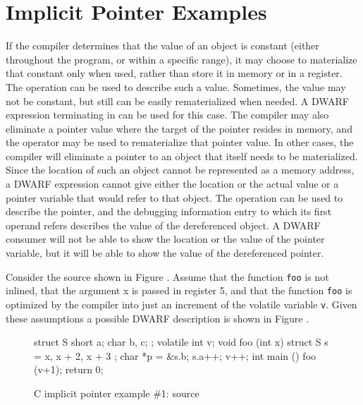 \section{Implicit Pointer Examples}
\label{app:implicitpointerexamples}
If the compiler determines that the value of an object is
constant (either throughout the program, or within a specific
range), it may choose to materialize that constant only when
used, rather than store it in memory or in a register. The
\DWOPimplicitvalue{} operation can be used to describe such a
value. Sometimes, the value may not be constant, but still can be
easily rematerialized when needed. A DWARF expression terminating
in \DWOPstackvalue{} can be used for this case. The compiler may
also eliminate a pointer value where the target of the pointer
resides in memory, and the \DWOPstackvalue{} operator may be used
to rematerialize that pointer value. In other cases, the compiler
will eliminate a pointer to an object that itself needs to be
materialized. Since the location of such an object cannot be
represented as a memory address, a DWARF expression cannot give
either the location or the actual value or a pointer variable
that would refer to that object. The \DWOPimplicitpointer{}
operation can be used to describe the pointer, and the debugging
information entry to which its first operand refers describes the
value of the dereferenced object. A DWARF consumer will not be
able to show the location or the value of the pointer variable,
but it will be able to show the value of the dereferenced
pointer.

Consider the  source shown in 
Figure .
Assume that the function \texttt{foo} is not inlined,
that the argument x is passed in register 5, and that the
function \texttt{foo} is optimized by the compiler into just 
an increment of the volatile variable \texttt{v}. Given these
assumptions a possible DWARF description is shown in
Figure .

\begin{figure}[ht]
\begin{nlnlisting}
struct S { short a; char b, c; };
volatile int v;
void foo (int x)
{
    struct S s = { x, x + 2, x + 3 };
    char *p = &s.b;
    s.a++;
    v++;
}
int main ()
{
    foo (v+1);
    return 0;
}
\end{nlnlisting}
\caption{C implicit pointer example \#1: source}
\label{fig:cimplicitpointerexample1source}
\end{figure}

